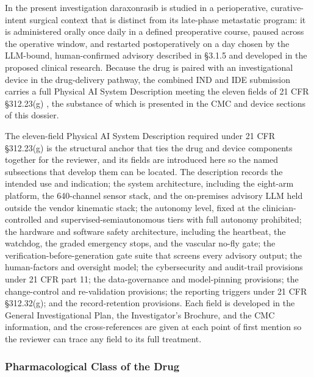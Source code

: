 In the present investigation daraxonrasib is studied in a perioperative,
curative-intent surgical context that is distinct from its late-phase metastatic
program: it is administered orally once daily in a defined preoperative course,
paused across the operative window, and restarted postoperatively on a day chosen
by the LLM-bound, human-confirmed advisory described in \S 3.1.5 and developed in
the proposed clinical research. Because the drug is paired with an investigational
device in the drug-delivery pathway, the combined IND and IDE submission carries a
full Physical AI System Description meeting the eleven fields of 21 CFR
\S 312.23(g) \cite{cfr312paiuni}, the substance of which is presented in the CMC
and device sections of this dossier.

The eleven-field Physical AI System Description required under 21 CFR \S 312.23(g)
is the structural anchor that ties the drug and device components together for the
reviewer, and its fields are introduced here so the named subsections that develop
them can be located. The description records the intended use and indication; the
system architecture, including the eight-arm platform, the 640-channel sensor
stack, and the on-premises advisory LLM held outside the vendor kinematic stack; the
autonomy level, fixed at the clinician-controlled and supervised-semiautonomous
tiers with full autonomy prohibited; the hardware and software safety architecture,
including the heartbeat, the watchdog, the graded emergency stops, and the vascular
no-fly gate; the verification-before-generation gate suite that screens every
advisory output; the human-factors and oversight model; the cybersecurity and
audit-trail provisions under 21 CFR part 11; the data-governance and model-pinning
provisions; the change-control and re-validation provisions; the reporting triggers
under 21 CFR \S 312.32(g); and the record-retention provisions. Each field is
developed in the General Investigational Plan, the Investigator's Brochure, and the
CMC information, and the cross-references are given at each point of first mention so
the reviewer can trace any field to its full treatment.

\clearpage

\subsubsection{Pharmacological Class of the Drug}

